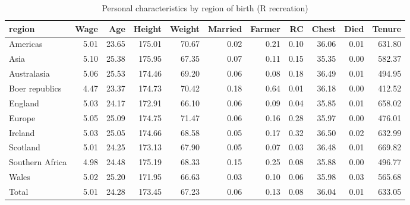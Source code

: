 \begin{table}

\caption{Personal characteristics by region of birth (R recreation)}
\centering
\begin{tabular}[t]{lrrrrrrrrrr}
\toprule
region & Wage & Age & Height & Weight & Married & Farmer & RC & Chest & Died & Tenure\\
\midrule
Americas & 5.01 & 23.65 & 175.01 & 70.67 & 0.02 & 0.21 & 0.10 & 36.06 & 0.01 & 631.80\\
Asia & 5.10 & 25.38 & 175.95 & 67.35 & 0.07 & 0.11 & 0.15 & 35.35 & 0.00 & 582.37\\
Australasia & 5.06 & 25.53 & 174.46 & 69.20 & 0.06 & 0.08 & 0.18 & 36.49 & 0.01 & 494.95\\
Boer republics & 4.47 & 23.37 & 174.73 & 70.42 & 0.18 & 0.64 & 0.01 & 36.18 & 0.00 & 412.52\\
England & 5.03 & 24.17 & 172.91 & 66.10 & 0.06 & 0.09 & 0.04 & 35.85 & 0.01 & 658.02\\
\addlinespace
Europe & 5.05 & 25.09 & 174.75 & 71.47 & 0.06 & 0.16 & 0.28 & 35.97 & 0.00 & 476.01\\
Ireland & 5.03 & 25.05 & 174.66 & 68.58 & 0.05 & 0.17 & 0.32 & 36.50 & 0.02 & 632.99\\
Scotland & 5.01 & 24.25 & 173.13 & 67.90 & 0.05 & 0.07 & 0.03 & 36.48 & 0.01 & 669.82\\
Southern Africa & 4.98 & 24.48 & 175.19 & 68.33 & 0.15 & 0.25 & 0.08 & 35.88 & 0.00 & 496.77\\
Wales & 5.02 & 25.20 & 171.95 & 66.63 & 0.03 & 0.10 & 0.06 & 35.98 & 0.03 & 565.68\\
\addlinespace
Total & 5.01 & 24.28 & 173.45 & 67.23 & 0.06 & 0.13 & 0.08 & 36.04 & 0.01 & 633.05\\
\bottomrule
\end{tabular}
\end{table}
